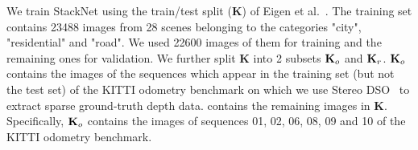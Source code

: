 \documentclass[runningheads]{llncs}
\begin{document}
We train StackNet using the train/test split (\textbf{K}) of 
Eigen et al.~\cite{eigen2014depth}. 
The training set contains 23488 images from 
28 scenes belonging to the categories "city", 
"residential" and "road". We used 22600 images of 
them for training and the remaining ones for validation. We 
further split \textbf{K} into 2 subsets $\text{\textbf{K}}_o$ and 
$\text{\textbf{K}}_r$. 
$\text{\textbf{K}}_o$ contains the images of the sequences 
which appear in the training set (but not the test set) of 
the KITTI odometry benchmark on which we use 
Stereo DSO~\cite{wang2017stereoDSO} to extract 
sparse ground-truth depth data. 
contains the remaining images in 
\textbf{K}. 
Specifically, $\text{\textbf{K}}_o$ contains the images of 
sequences 01, 02, 06, 08, 09 and 10 of the KITTI 
odometry benchmark.
\end{document}
